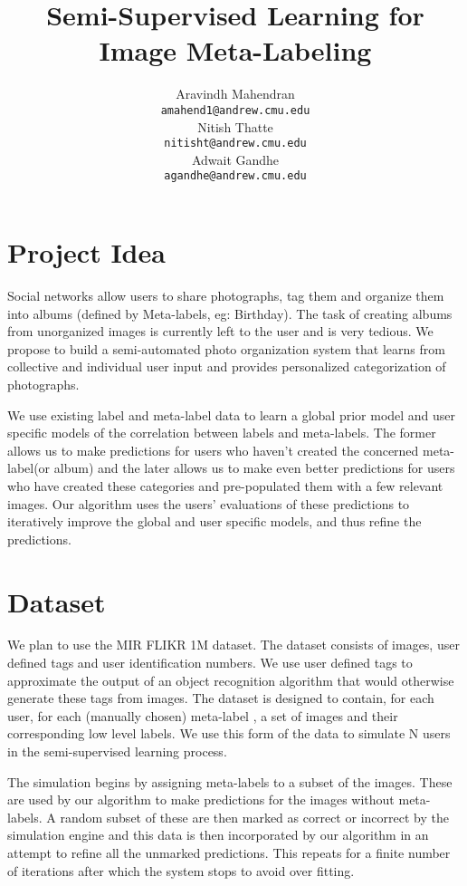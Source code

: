 \documentclass{article} %
\title{Semi-Supervised Learning for Image Meta-Labeling}
\author{
Aravindh Mahendran \\
\texttt{amahend1@andrew.cmu.edu} \\ 
\And
Nitish Thatte \\
\texttt{nitisht@andrew.cmu.edu} \\
\AND
Adwait Gandhe \\
\texttt{agandhe@andrew.cmu.edu} \\
}
\begin{document}
\vspace{-0.5in}
\maketitle
\vspace{-0.25in}
\section{Project Idea}
\label{sec:projidea}
Social networks allow users to share photographs, tag them and organize them into albums (defined by Meta-labels, eg: Birthday). The task of creating albums from unorganized images is currently left to the user and is very tedious. We propose to build a semi-automated photo organization system that learns from collective and individual user input and provides personalized categorization of photographs. 

We use existing label and meta-label data to learn a global prior model and user specific models of the correlation between labels and meta-labels. The former allows us to make predictions for users who haven't created the concerned meta-label(or album) and the later allows us to make even better predictions for users who have created these categories and pre-populated them with a few relevant images. Our algorithm uses the users' evaluations of these predictions to iteratively improve the global and user specific models, and thus refine the predictions.

\section{Dataset}
We plan to use the MIR FLIKR 1M dataset. The dataset consists of images, user defined tags and user identification numbers. 
We use user defined tags to approximate the output of an object recognition algorithm that would otherwise generate these tags from images.
The dataset is designed to contain, for each user, for each (manually chosen) meta-label , a set of images and their corresponding low level labels. We use this form of the data to simulate N users in the semi-supervised learning process. 

The simulation begins by assigning meta-labels to a subset of the images. These are used by our algorithm to make predictions for the images without meta-labels. A random subset of these are then marked as correct or incorrect by the simulation engine and this data is then incorporated by our algorithm in an attempt to refine all the unmarked predictions. This repeats for a finite number of iterations after which the system stops to avoid over fitting.
\end{document}
